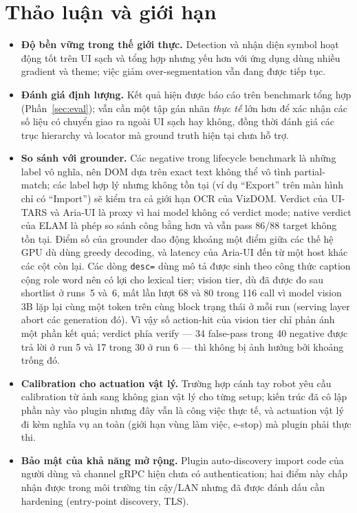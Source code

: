 \documentclass[11pt,a4paper]{article}
\newcommand{\code}[1]{\texttt{#1}}
\begin{document}
\section{Thảo luận và giới hạn}
\begin{itemize}[leftmargin=1.4em]
  \item \textbf{Độ bền vững trong thế giới thực.} Detection và nhận diện symbol
        hoạt động tốt trên UI sạch và tổng hợp nhưng yếu hơn với ứng dụng dùng nhiều
        gradient và theme; việc giảm over-segmentation vẫn đang được tiếp tục.
  \item \textbf{Đánh giá định lượng.} Kết quả hiện được báo cáo trên benchmark tổng
        hợp (Phần~\ref{sec:eval}); vẫn cần một tập gán nhãn \emph{thực tế} lớn hơn
        để xác nhận các số liệu có chuyển giao ra ngoài UI sạch hay không, đồng thời
        đánh giá các trục hierarchy và locator mà ground truth hiện tại chưa hỗ trợ.
  \item \textbf{So sánh với grounder.} Các negative trong lifecycle benchmark là
        những label vô nghĩa, nên DOM dựa trên exact text không thể vô tình partial-match;
        các label hợp lý nhưng không tồn tại (ví dụ ``Export'' trên màn hình chỉ có
        ``Import'') sẽ kiểm tra cả giới hạn OCR của VizDOM. Verdict của UI-TARS và
        Aria-UI là proxy vì hai model không có verdict mode; native verdict của ELAM là
        phép so sánh công bằng hơn và vẫn pass 86/88 target không tồn tại. Điểm số của
        grounder dao động khoảng một điểm giữa các thế hệ GPU dù dùng greedy decoding,
        và latency của Aria-UI đến từ một host khác các cột còn lại. Các dòng
        \code{desc=} dùng mô tả được sinh theo công thức caption cộng role word nên
        có lợi cho lexical tier; vision tier, dù đã được đo sau shortlist ở runs~5
        và~6, mất lần lượt 68 và 80 trong 116 call vì model vision 3B lặp lại cùng
        một token trên cùng block trạng thái ở mỗi run (serving layer abort các
        generation đó). Vì vậy số action-hit của vision tier chỉ phản ánh một phần
        kết quả; verdict phía verify --- 34 false-pass trong 40 negative được trả lời
        ở run 5 và 17 trong 30 ở run 6 --- thì không bị ảnh hưởng bởi khoảng trống đó.
  \item \textbf{Calibration cho actuation vật lý.} Trường hợp cánh tay robot yêu cầu
        calibration từ ảnh sang không gian vật lý cho từng setup; kiến trúc đã cô
        lập phần này vào plugin nhưng đây vẫn là công việc thực tế, và actuation vật
        lý đi kèm nghĩa vụ an toàn (giới hạn vùng làm việc, e-stop) mà plugin phải
        thực thi.
  \item \textbf{Bảo mật của khả năng mở rộng.} Plugin auto-discovery import code của
        người dùng và channel gRPC hiện chưa có authentication; hai điểm này chấp
        nhận được trong môi trường tin cậy/LAN nhưng đã được đánh dấu cần hardening
        (entry-point discovery, TLS).
\end{itemize}
\end{document}
